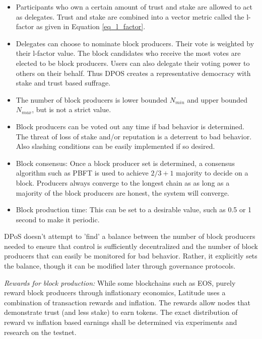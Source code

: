 \begin{itemize}
\item Participants who own a certain amount of trust and stake are allowed to act as delegates. Trust and stake are
    combined into a vector metric called the l-factor as given in Equation \ref{eq_l_factor}.
\item Delegates can choose to nominate block producers. Their vote is weighted by their l-factor value. The block
    candidates who receive the most votes are elected to be block producers. Users can also delegate their voting power
        to others on their behalf. Thus DPOS creates a representative democracy with stake and trust based suffrage.
\item The number of block producers is lower bounded $N_{min}$ and upper bounded $N_{max}$, but is not a strict value.

\item Block producers can be voted out any time if bad behavior is determined. The threat of loss of stake and/or
    reputation is a deterrent to bad behavior. Also slashing conditions can be easily implemented if so desired.
\item Block consensus: Once a block producer set is determined, a consensus algorithm such as PBFT is used to
    achieve $2/3 +1$ majority to decide on a block. Producers always converge to the longest chain as as long as a
        majority of the block producers are honest, the system will converge.
\item Block production time: This can be set to a desirable value, such as 0.5 or 1 second to make it periodic.
\end{itemize}

DPoS doesn't attempt to 'find' a balance between the number of block producers needed to ensure that control is
sufficiently decentralized and the number of block producers that can easily be monitored for bad behavior. Rather, it
explicitly sets the balance, though it can be modified later through governance protocols.

\noindent
{\em Rewards for block production:} While some blockchains such as EOS, purely reward block producers through inflationary
economics, Latitude uses a combination of transaction rewards and inflation. The rewards allow nodes that demonstrate
trust (and less stake) to earn tokens. The exact distribution of reward vs inflation based earnings shall be determined
via experiments and research on the testnet.


